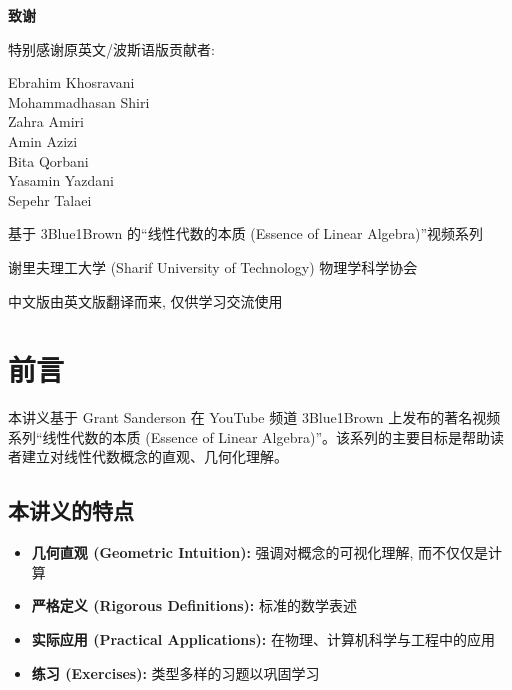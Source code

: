 \begin{titlepage}
\centering
\vspace*{3cm}

{\Large\bfseries 致谢}

\vspace{2cm}

{\large 特别感谢原英文/波斯语版贡献者:}

\vspace{1cm}

Ebrahim Khosravani\\[0.25cm]
Mohammadhasan Shiri\\[0.25cm]
Zahra Amiri\\[0.25cm]
Amin Azizi\\[0.25cm]
Bita Qorbani\\[0.25cm]
Yasamin Yazdani\\[0.25cm]
Sepehr Talaei

\vspace{2cm}

{\small 基于 3Blue1Brown 的``线性代数的本质 (Essence of Linear Algebra)''视频系列}

\vspace{1cm}

{\small 谢里夫理工大学 (Sharif University of Technology) 物理学科学协会}

\vspace{1cm}
{\small 中文版由英文版翻译而来, 仅供学习交流使用}
\end{titlepage}

\tableofcontents

\chapter*{前言}

本讲义基于 Grant Sanderson 在 YouTube 频道 3Blue1Brown 上发布的著名视频系列``线性代数的本质 (Essence of Linear Algebra)''。该系列的主要目标是帮助读者建立对线性代数概念的直观、几何化理解。

\section*{本讲义的特点}
\begin{itemize}
    \item \textbf{几何直观 (Geometric Intuition):} 强调对概念的可视化理解, 而不仅仅是计算
    \item \textbf{严格定义 (Rigorous Definitions):} 标准的数学表述
    \item \textbf{实际应用 (Practical Applications):} 在物理、计算机科学与工程中的应用
    \item \textbf{练习 (Exercises):} 类型多样的习题以巩固学习
\end{itemize}


